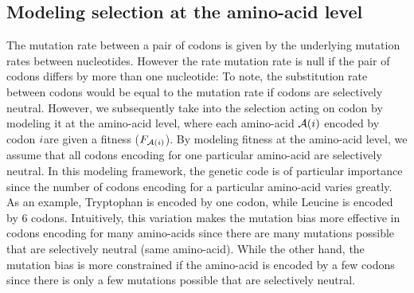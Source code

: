 \subsection{Modeling selection at the amino-acid level}
The mutation rate between a pair of \glspl{codon} is given by the underlying mutation rates between nucleotides.
However the rate mutation rate is null if the pair of \glspl{codon} differs by more than one nucleotide:
To note, the \gls{substitution} rate between \glspl{codon} would be equal to the mutation rate if \glspl{codon} are selectively \gls{neutral}.
However, we subsequently take into the selection acting on \gls{codon} by modeling it at the amino-acid level, where each amino-acid $\mathcal{A}({i})$ encoded by codon ${i} $are given a fitness ($F_{\mathcal{A}({i})}$).
By modeling fitness at the amino-acid level, we assume that all \glspl{codon} encoding for one particular amino-acid are selectively \gls{neutral}.
In this modeling framework, the genetic code is of particular importance since the number of \glspl{codon} encoding for a particular amino-acid varies greatly.
As an example, Tryptophan is encoded by one \gls{codon}, while Leucine is encoded by 6 \glspl{codon}.
Intuitively, this variation makes the mutation bias more effective in \glspl{codon} encoding for many amino-acids since there are many mutations possible that are selectively \gls{neutral} (same amino-acid).
While the other hand, the mutation bias is more constrained if the amino-acid is encoded by a few \glspl{codon} since there is only a few mutations possible that are selectively \gls{neutral}.\\

